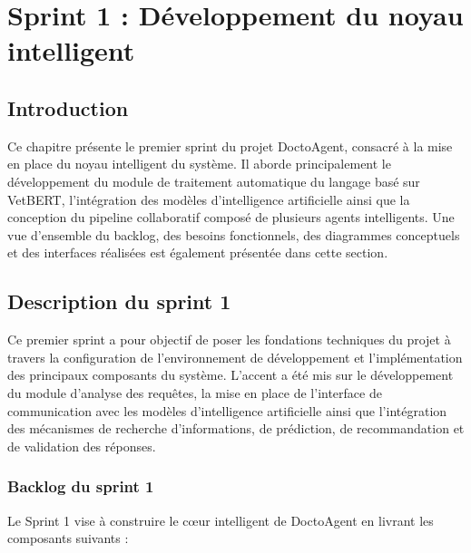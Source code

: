 \chapter{Sprint 1 : Développement du noyau intelligent}
\section*{Introduction}

Ce chapitre présente le premier sprint du projet DoctoAgent, consacré à la mise en place du noyau intelligent du système. Il aborde principalement le développement du module de traitement automatique du langage basé sur VetBERT, l'intégration des modèles d'intelligence artificielle ainsi que la conception du pipeline collaboratif composé de plusieurs agents intelligents. Une vue d'ensemble du backlog, des besoins fonctionnels, des diagrammes conceptuels et des interfaces réalisées est également présentée dans cette section.

\section{Description du sprint 1}

Ce premier sprint a pour objectif de poser les fondations techniques du projet à travers la configuration de l'environnement de développement et l'implémentation des principaux composants du système. L'accent a été mis sur le développement du module d'analyse des requêtes, la mise en place de l'interface de communication avec les modèles d'intelligence artificielle ainsi que l'intégration des mécanismes de recherche d'informations, de prédiction, de recommandation et de validation des réponses.

\subsection{Backlog du sprint 1}

Le Sprint 1 vise à construire le cœur intelligent de DoctoAgent en livrant les composants suivants :


